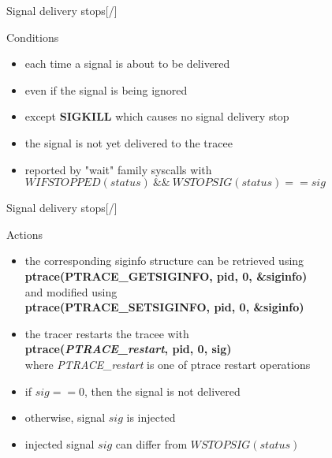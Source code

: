 \documentclass[unicode,aspectratio=169,xcolor={table,dvipsnames,usernames}]{beamer}
\begin{document}
\begin{frame}{\Large Signal delivery stops\hfill [\insertframenumber/\inserttotalframenumber]}
\Large
\begin{block}{Conditions}
\begin{itemize}
	\item each time a signal is about to be delivered
	\item even if the signal is being ignored
	\item except \textbf{SIGKILL} which causes no signal delivery stop
	\item the signal is not yet delivered to the tracee
	\item reported by "wait" family syscalls with \\
		$WIFSTOPPED(status)\ \&\&\ WSTOPSIG(status) == sig$
\end{itemize}
\end{block}
\end{frame}

\begin{frame}{\Large Signal delivery stops\hfill [\insertframenumber/\inserttotalframenumber]}
\Large
\begin{block}{Actions}
\begin{itemize}
	\item the corresponding siginfo structure can be retrieved using \\
		\textbf{ptrace(PTRACE\_GETSIGINFO, pid, 0, \&siginfo)} \\
		and modified using \\
		\textbf{ptrace(PTRACE\_SETSIGINFO, pid, 0, \&siginfo)}
	\item the tracer restarts the tracee with \\
		\textbf{ptrace(\textit{PTRACE\_restart}, pid, 0, sig)} \\
	where \textit{PTRACE\_restart} is one of ptrace restart operations
	\item if $sig == 0$, then the signal is not delivered
	\item otherwise, signal $sig$ is injected
	\item injected signal $sig$ can differ from $WSTOPSIG(status)$
\end{itemize}
\end{block}
\end{frame}
\end{document}
